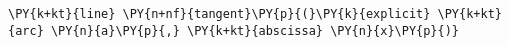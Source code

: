 \begin{Verbatim}[commandchars=\\\{\}]
    \PY{k+kt}{line} \PY{n+nf}{tangent}\PY{p}{(}\PY{k}{explicit} \PY{k+kt}{arc} \PY{n}{a}\PY{p}{,} \PY{k+kt}{abscissa} \PY{n}{x}\PY{p}{)}
\end{Verbatim}
